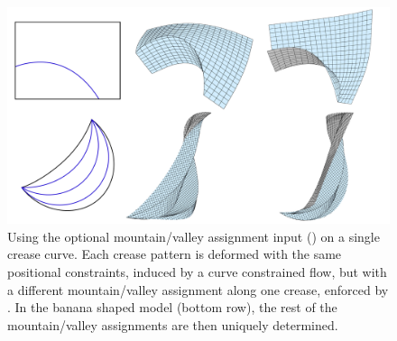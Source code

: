 \begin{figure} [b]
	\centering
	\includegraphics[width=\linewidth]{figures/MV_bias_modeling}
	\caption{Using the optional mountain/valley assignment input () on a single crease curve. Each crease pattern is deformed with the same positional constraints, induced by a curve constrained flow, but with a different mountain/valley assignment along one crease, enforced by . In the banana shaped model (bottom row), the rest of the mountain/valley assignments are then uniquely determined.}
	\label{fig:MV_bias_modeling}
\end{figure}


